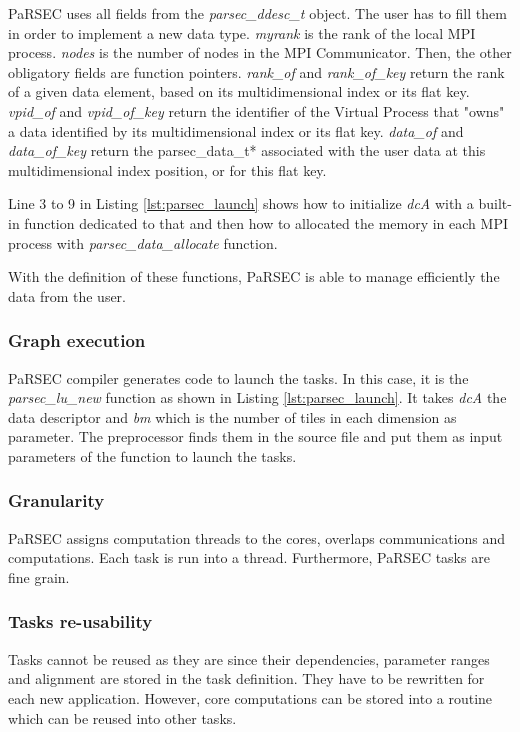 PaRSEC uses all fields from the \textit{parsec\_ddesc\_t} object.
The user has to fill them in order to implement a new data type.
\textit{myrank} is the rank of the local MPI process.
\textit{nodes} is the number of nodes in the MPI Communicator.
Then, the other obligatory fields are function pointers.
\textit{rank\_of} and \textit{rank\_of\_key} return the rank of a given data element, based on its multidimensional index or its flat key.
\textit{vpid\_of} and \textit{vpid\_of\_key} return the identifier of the Virtual Process that "owns" a data identified by its multidimensional index or its flat key.
\textit{data\_of} and \textit{data\_of\_key} return the parsec\_data\_t* associated with the user data at this multidimensional index position, or for this flat key.

Line 3 to 9 in Listing \ref{lst:parsec_launch} shows how to initialize \textit{dcA} with a built-in function dedicated to that and then how to allocated the memory in each MPI process with \textit{parsec\_data\_allocate} function.

With the definition of these functions, PaRSEC is able to manage efficiently the data from the user.


\subsubsection{Graph execution}
PaRSEC compiler generates code to launch the tasks.
In this case, it is the \textit{parsec\_lu\_new} function as shown in Listing \ref{lst:parsec_launch}.
It takes \textit{dcA} the data descriptor and \textit{bm} which is the number of tiles in each dimension as parameter.
The preprocessor finds them in the source file and put them as input parameters of the function to launch the tasks.

\begin{figure}

\end{figure}


\subsubsection{Granularity}
PaRSEC assigns computation threads to the cores, overlaps communications and computations.
Each task is run into a thread.
Furthermore, PaRSEC tasks are fine grain.

\subsubsection{Tasks re-usability}
Tasks cannot be reused as they are since their dependencies, parameter ranges and alignment are stored in the task definition.
They have to be rewritten for each new application.
However, core computations can be stored into a routine which can be reused into other tasks.

